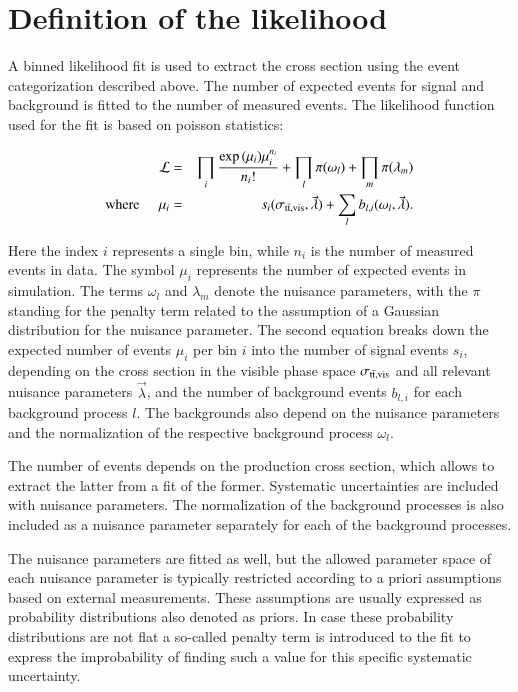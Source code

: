     
\section{Definition of the likelihood}
\label{sec:xsec_stat}

A binned likelihood fit is used to extract the \ttbar cross section using the event categorization described above. 
The number of expected events for signal and background is fitted to the number of measured events. 
The likelihood function used for the fit is based on poisson statistics:

\begin{eqnarray}
   \mathcal{L}  &=& \prod_{i} \frac{\exp{(\mu_i)} \mu_i^{n_i}}{n_i !}  + \prod_{l} \pi(\omega_l) + \prod_{m} \pi(\lambda_m) \\
 \mathrm{where} \; \; \; \; \; \mu_i &=& s_i(\sigma_{\mathrm{t}\bar{\mathrm{t}},\mathrm{vis}},\vec{\lambda}) + \sum_{l} b_{l,i}(\omega_l,\vec{\lambda}).
\label{eq:xsec_chisqfunct}
\end{eqnarray}

Here the index $i$ represents a single bin, while $n_i$ is the number of measured events in data. The symbol $\mu_i$ represents the number
of expected events in simulation. The terms $\omega_l$ and $\lambda_m$
denote the nuisance parameters, with the $\pi$ standing for the penalty term related to the assumption of a Gaussian distribution for the nuisance parameter.
The second equation breaks down the expected number of events $\mu_i$ per bin $i$ into the number of signal events $s_i$, depending on the \ttbar cross section in the visible phase space $\sigma_{\mathrm{t}\bar{\mathrm{t}},\mathrm{vis}}$ and all relevant nuisance parameters $\vec{\lambda}$, and the number of
background events  $b_{l,i}$ for each background process $l$. The backgrounds also depend on the nuisance parameters and the normalization of the respective background process $\omega_l$.

The number of \ttbar events depends on the \ttbar production cross section, which allows to extract the latter from a fit of the former. Systematic uncertainties are included with nuisance parameters.
The normalization of the background processes is also included as a nuisance parameter separately for each of the background processes.

The nuisance parameters are fitted as well, but the allowed parameter space of each nuisance parameter is typically restricted according
to a priori assumptions based on external measurements. These assumptions are usually expressed as probability distributions also denoted as priors.
In case these probability distributions are not flat a so-called penalty term is introduced to the fit to express the improbability of finding such a value for this specific systematic uncertainty.

